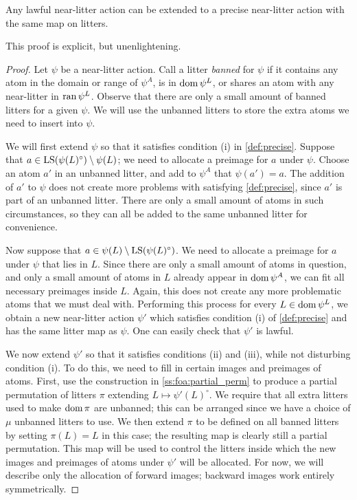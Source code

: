 \begin{lemma}
    \label{lem:foa:precise}
    Any lawful near-litter action can be extended to a precise near-litter action with the same map on litters.
\end{lemma}
This proof is explicit, but unenlightening.
\begin{proof}
    Let \( \psi \) be a near-litter action.
    Call a litter \emph{banned} for \( \psi \) if it contains any atom in the domain or range of \( \psi^A \), is in \( \operatorname{dom} \psi^L \), or shares an atom with any near-litter in \( \operatorname{ran} \psi^L \).
    Observe that there are only a small amount of banned litters for a given \( \psi \).
    We will use the unbanned litters to store the extra atoms we need to insert into \( \psi \).

    We will first extend \( \psi \) so that it satisfies condition (i) in \cref{def:precise}.
    Suppose that \( a \in \operatorname{LS}(\psi(L)^\circ) \setminus \psi(L) \); we need to allocate a preimage for \( a \) under \( \psi \).
    Choose an atom \( a' \) in an unbanned litter, and add to \( \psi^A \) that \( \psi(a') = a \).
    The addition of \( a' \) to \( \psi \) does not create more problems with satisfying \cref{def:precise}, since \( a' \) is part of an unbanned litter.
    There are only a small amount of atoms in such circumstances, so they can all be added to the same unbanned litter for convenience.

    Now suppose that \( a \in \psi(L) \setminus \operatorname{LS}(\psi(L)^\circ) \).
    We need to allocate a preimage for \( a \) under \( \psi \) that lies in \( L \).
    Since there are only a small amount of atoms in question, and only a small amount of atoms in \( L \) already appear in \( \operatorname{dom} \psi^A \), we can fit all necessary preimages inside \( L \).
    Again, this does not create any more problematic atoms that we must deal with.
    Performing this process for every \( L \in \operatorname{dom} \psi^L \), we obtain a new near-litter action \( \psi' \) which satisfies condition (i) of \cref{def:precise} and has the same litter map as \( \psi \).
    One can easily check that \( \psi' \) is lawful.

    We now extend \( \psi' \) so that it satisfies conditions (ii) and (iii), while not disturbing condition (i).
    To do this, we need to fill in certain images and preimages of atoms.
    First, use the construction in \cref{ss:foa:partial_perm} to produce a partial permutation of litters \( \pi \) extending \( L \mapsto \psi'(L)^\circ \).
    We require that all extra litters used to make \( \operatorname{dom} \pi \) are unbanned; this can be arranged since we have a choice of \( \mu \) unbanned litters to use.
    We then extend \( \pi \) to be defined on all banned litters by setting \( \pi(L) = L \) in this case; the resulting map is clearly still a partial permutation.
    This map will be used to control the litters inside which the new images and preimages of atoms under \( \psi' \) will be allocated.
    For now, we will describe only the allocation of forward images; backward images work entirely symmetrically.


\end{proof}
